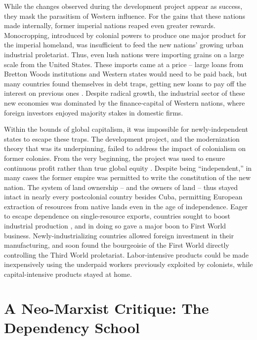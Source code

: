 \documentclass{../../../coursework}
\begin{document}
While the changes observed during the development project appear as success,
they mask the parasitism of Western influence. For the gains that these
nations made internally, former imperial nations reaped even greater rewards.
Monocropping, introduced by colonial powers to produce one major product for
the imperial homeland, was insufficient to feed the new nations' growing urban
industrial proletariat. Thus, even lush nations were importing grains on a
large scale from the United States. These imports came at a price -- large
loans from Bretton Woods institutions and Western states would need to be paid
back, but many countries found themselves in debt traps, getting new loans to
pay off the interest on previous ones \parencite{McMichael2004}. Despite
radical growth, the industrial sector of these new economies was dominated by
the finance-capital of Western nations, where foreign investors enjoyed
majority stakes in domestic firms.

Within the bounds of global capitalism, it was impossible for
newly-independent states to escape these traps. The development project, and
the modernization theory that was its underpinning, failed to address the
impact of colonialism on former colonies. From the very beginning, the project
was used to ensure continuous profit rather than true global equity
\parencite{Frank1966}. Despite being ``independent,'' in many cases the former
empire was permitted to write the constitution of the new nation. The system
of land ownership -- and the owners of land -- thus stayed intact in nearly
every postcolonial country besides Cuba, permitting European extraction of
resources from native lands even in the age of independence. Eager to escape
dependence on single-resource exports, countries sought to boost industrial
production \parencite{McMichael2004}, and in doing so gave a major boon to
First World business. Newly-industrializing countries allowed foreign
investment in their manufacturing, and soon found the bourgeoisie of the First
World directly controlling the Third World proletariat. Labor-intensive
products could be made inexpensively using the underpaid workers previously
exploited by colonists, while capital-intensive products stayed at home.

\section{A Neo-Marxist Critique: The Dependency School}
\end{document}
